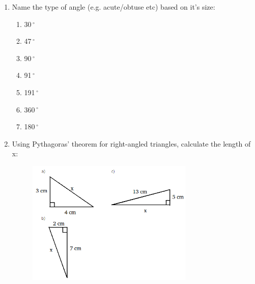 \begin{enumerate}[noitemsep, label=\textbf{\arabic*}. ]
        
\label{m39368*uid143}\item Name the type of angle (e.g. acute/obtuse etc) based on it's size:
\label{m39368*id401235}\begin{enumerate}[noitemsep, label=\textbf{\alph*}. ] 
            \item  30\ensuremath{{\,}^{\circ}}\item  47\ensuremath{{\,}^{\circ}}\item  90\ensuremath{{\,}^{\circ}}\item  91\ensuremath{{\,}^{\circ}}\item  191\ensuremath{{\,}^{\circ}}\item  360\ensuremath{{\,}^{\circ}}\item  180\ensuremath{{\,}^{\circ}}\end{enumerate}
        
        
\label{m39368*uid144}\item Using Pythagoras' theorem for right-angled triangles, calculate the length of x:

          
    \setcounter{subfigure}{0}


	\begin{figure}[H] %
    \begin{center}
    \label{m39368*id401236!!!underscore!!!media}\label{m39368*id401236!!!underscore!!!printimage}\includegraphics[width=300px]{col11306.imgs/m39368_MG10C13_070.png} %
        
      \vspace{2pt}
    \vspace{.1in}
    
    \end{center}

 \end{figure}   

    \addtocounter{footnote}{-0}
    
        
\end{enumerate}
        
